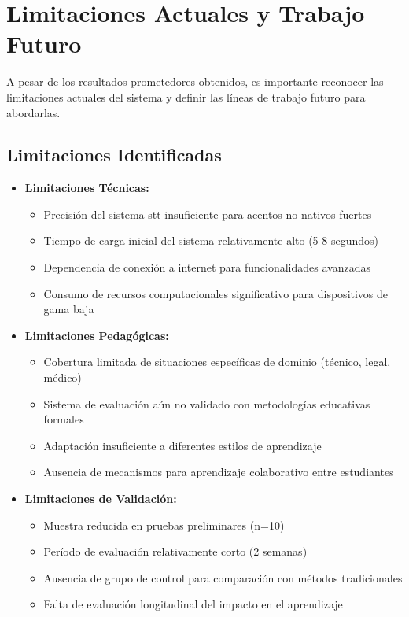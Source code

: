 \section{Limitaciones Actuales y Trabajo Futuro}
\label{sec:limitaciones-trabajo-futuro}

A pesar de los resultados prometedores obtenidos, es importante reconocer las limitaciones actuales del sistema y definir las líneas de trabajo futuro para abordarlas.

\subsection{Limitaciones Identificadas}
\label{subsec:limitaciones-identificadas}

\begin{itemize}
    \item \textbf{Limitaciones Técnicas:}
    \begin{itemize}
        \item Precisión del sistema \gls{stt} insuficiente para acentos no nativos fuertes
        \item Tiempo de carga inicial del sistema relativamente alto (5-8 segundos)
        \item Dependencia de conexión a internet para funcionalidades avanzadas
        \item Consumo de recursos computacionales significativo para dispositivos de gama baja
    \end{itemize}

    \item \textbf{Limitaciones Pedagógicas:}
    \begin{itemize}
        \item Cobertura limitada de situaciones específicas de dominio (técnico, legal, médico)
        \item Sistema de evaluación aún no validado con metodologías educativas formales
        \item Adaptación insuficiente a diferentes estilos de aprendizaje
        \item Ausencia de mecanismos para aprendizaje colaborativo entre estudiantes
    \end{itemize}

    \item \textbf{Limitaciones de Validación:}
    \begin{itemize}
        \item Muestra reducida en pruebas preliminares (n=10)
        \item Período de evaluación relativamente corto (2 semanas)
        \item Ausencia de grupo de control para comparación con métodos tradicionales
        \item Falta de evaluación longitudinal del impacto en el aprendizaje
    \end{itemize}
\end{itemize}


